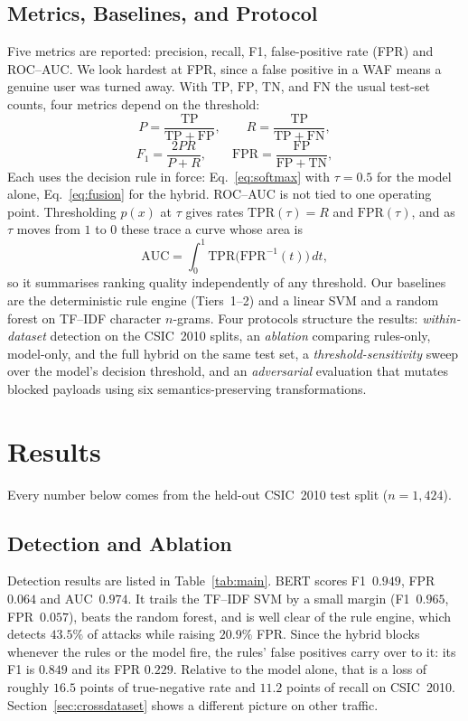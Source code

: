\documentclass[conference]{IEEEtran}
\begin{document}
\subsection{Metrics, Baselines, and Protocol}
Five metrics are reported: precision, recall, F1, false-positive rate (FPR)
and ROC--AUC. We look hardest at FPR, since a false positive in a WAF means
a genuine user was turned away. With $\mathrm{TP}$, $\mathrm{FP}$, $\mathrm{TN}$, and $\mathrm{FN}$ the
usual test-set counts, four metrics depend on the threshold:
\begin{equation}
P=\frac{\mathrm{TP}}{\mathrm{TP}+\mathrm{FP}}, \qquad
R=\frac{\mathrm{TP}}{\mathrm{TP}+\mathrm{FN}},
\label{eq:pr}
\end{equation}
\begin{equation}
F_1=\frac{2PR}{P+R}, \qquad
\mathrm{FPR}=\frac{\mathrm{FP}}{\mathrm{FP}+\mathrm{TN}},
\label{eq:f1fpr}
\end{equation}
Each uses the decision rule in force: Eq.~\eqref{eq:softmax} with
$\tau=0.5$ for the model alone, Eq.~\eqref{eq:fusion} for the hybrid. ROC--AUC is not tied to one operating point. Thresholding $p(x)$ at $\tau$
gives rates $\mathrm{TPR}(\tau)=R$ and $\mathrm{FPR}(\tau)$, and as $\tau$
moves from $1$ to $0$ these trace a curve whose area is
\begin{equation}
\mathrm{AUC} = \int_0^1 \mathrm{TPR}\bigl(\mathrm{FPR}^{-1}(t)\bigr)\,dt,
\label{eq:auc}
\end{equation}
so it summarises ranking quality independently of any threshold. Our baselines
are the deterministic rule engine (Tiers~1--2) and a linear SVM and a random
forest on TF--IDF character $n$-grams.
Four protocols structure the results:
\emph{within-dataset} detection on the CSIC~2010 splits, an
\emph{ablation} comparing rules-only, model-only, and the full hybrid on
the same test set, a \emph{threshold-sensitivity} sweep over the model's
decision threshold, and an \emph{adversarial} evaluation that mutates
blocked payloads using six semantics-preserving transformations.

\section{Results}
Every number below comes from the held-out CSIC~2010 test split
($n=1{,}424$).

\subsection{Detection and Ablation}
Detection results are listed in Table~\ref{tab:main}. BERT scores
F1~$0.949$, FPR~$0.064$ and AUC~$0.974$. It trails the TF--IDF SVM by a
small margin (F1~$0.965$, FPR~$0.057$), beats the random forest, and is
well clear of the rule engine, which detects $43.5\%$ of attacks while
raising $20.9\%$ FPR. Since the hybrid blocks whenever the rules or the
model fire, the rules' false positives carry over to it: its F1 is $0.849$
and its FPR $0.229$. Relative to the model alone, that is a loss of roughly
$16.5$ points of true-negative rate and $11.2$ points of recall on
CSIC~2010. Section~\ref{sec:crossdataset} shows a different picture on
other traffic.
\end{document}
